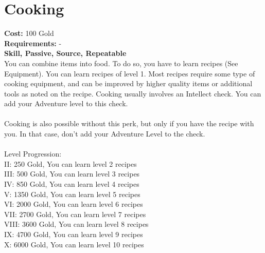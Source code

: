 \section*{Cooking}
\textbf{Cost:} 100 Gold\\
\textbf{Requirements:} -\\
\textbf{Skill, Passive, Source, Repeatable}\\
You can combine items into food. To do so, you have to learn recipes (See Equipment). You can learn recipes of level 1. Most recipes require some type of cooking equipment, and can be improved by higher quality items or additional tools as noted on the recipe. Cooking usually involves an Intellect check. You can add your Adventure level to this check. \\
\\
Cooking is also possible without this perk, but only if you have the recipe with you. In that case, don't add your Adventure Level to the check.\\
\\
Level Progression:\\
II: 250 Gold, You can learn level 2 recipes\\
III: 500 Gold, You can learn level 3 recipes\\
IV: 850 Gold, You can learn level 4 recipes\\
V: 1350 Gold, You can learn level 5 recipes\\
VI: 2000 Gold, You can learn level 6 recipes\\
VII: 2700 Gold, You can learn level 7 recipes\\
VIII: 3600 Gold, You can learn level 8 recipes\\
IX: 4700 Gold, You can learn level 9 recipes\\
X: 6000 Gold, You can learn level 10 recipes\\
